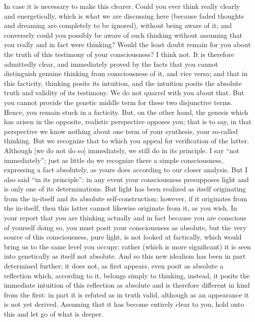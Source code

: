 In case it is necessary to make this clearer.
Could you ever think really clearly and energetically,
which is what we are discussing here
(because faded thoughts and dreaming are
completely to be ignored),
without being aware of it;
and conversely could you possibly be
aware of such thinking without assuming
that you really and in fact were thinking?
Would the least doubt remain for you about the truth
of this testimony of your consciousness?
I think not.
It is therefore admittedly clear,
and immediately proved by the facts
that you cannot distinguish genuine thinking
from consciousness of it, and vice versa;
and that in this facticity, thinking posits its intuition,
and the intuition posits the absolute
truth and validity of its testimony.
We do not quarrel with you about that.
But you cannot provide the genetic middle term
for these two disjunctive terms.
Hence, you remain stuck in a facticity.
But, on the other hand, the genesis
which has arisen in the opposite, realistic perspective opposes you;
that is to say, in that perspective we know nothing about
one term of your synthesis, your so-called thinking.
But we recognize that to which you appeal
for verification of the latter.
Although [we do not do so] immediately,
we still do in its principle.
I say “not immediately”;
just as little do we recognize
there a simple consciousness,
expressing a fact absolutely,
as yours does according to our closer analysis.
But I also said “in its principle”:
in any event your consciousness presupposes light
and is only one of its determinations.
But light has been realized as itself originating from the in-itself
and its absolute self-construction;
however, if it originates from the in-itself,
then this latter cannot likewise originate from it, as you wish.
In your report that you are thinking actually and in fact
because you are conscious of yourself doing so,
you must posit your consciousness as absolute,
but the very source of this consciousness,
pure light, is not looked at factically,
which would bring us to the same level you occupy;
rather (which is more significant) it is
seen into genetically as itself not absolute.
And so this new idealism has been in part
determined further;
it does not, as first appears, even posit
as absolute a reflection which, according to it,
belongs simply to thinking, instead,
it posits the immediate intuition of this reflection as absolute
and is therefore different in kind from the first:
in part it is refuted as in truth valid,
although as an appearance it is not yet derived.
Assuming that it has become entirely clear to you,
hold onto this and let go of what is deeper.

